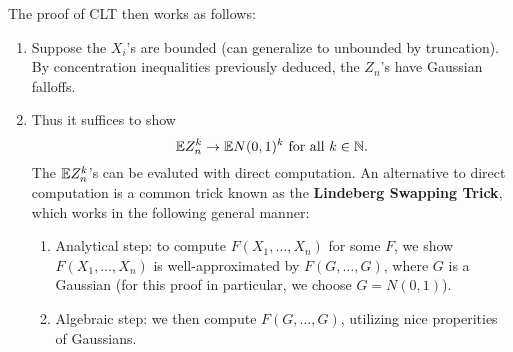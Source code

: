 The proof of CLT then works as follows:
\begin{enumerate}
    \item Suppose the $X_i$'s are bounded (can generalize to unbounded by truncation). By concentration inequalities previously deduced, the $Z_n$'s have Gaussian falloffs.
    \item Thus it suffices to show
    \[
        {\mathbb E} Z_n^k \to {\mathbb E} N(0,1)^k \text{ for all } k \in {\mathbb N}.
    \]
    The ${\mathbb E} Z_n^k$'s can be evaluted with direct computation. An alternative to direct computation is a common trick known as the \textbf{Lindeberg Swapping Trick}, which works in the following general manner:
    \begin{enumerate}
        \item Analytical step: to compute $F(X_1, \dots, X_n)$ for some $F$, we show $F(X_1, \dots, X_n)$ is well-approximated by $F(G, \dots, G)$, where $G$ is a Gaussian (for this proof in particular, we choose $G = N(0,1)$).
        \item Algebraic step: we then compute $F(G, \dots, G)$, utilizing nice properities of Gaussians.
    \end{enumerate}
\end{enumerate}

